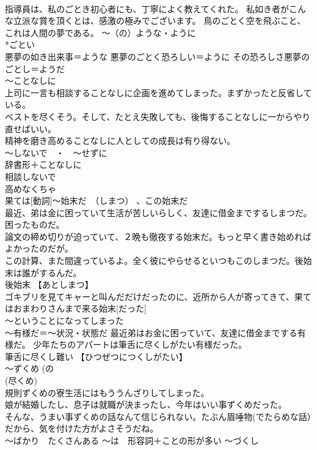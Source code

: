 \documentclass[8pt]{extreport}
\begin{document}
\begin{CJK}{UTF8}{min}
\\	指導員は、私のごとき初心者にも、丁寧によく教えてくれた。 私如き者がこんな立派な賞を頂くとは、感激の極みでございます。 鳥のごとく空を飛ぶこと、これは人間の夢である。	～（の）ような・ように 
\\	*ごとい 
\\	悪夢の如き出来事＝ような 悪夢のごとく恐ろしい＝ように その恐ろしさ悪夢のごとし＝ようだ
\\	～ことなしに	
\\	上司に一言も相談することなしに企画を進めてしまった。まずかったと反省している。 
\\	ベストを尽くそう。そして、たとえ失敗しても、後悔することなしに一からやり直せばいい。 
\\	精神を磨き高めることなしに人としての成長は有り得ない。 
\\	～しないで　・　～せずに 
\\	辞書形＋ことなしに	
\\	相談しないで 
\\	高めなくちゃ
\\	{果ては}[動詞]～始末だ　（しまつ） 、この始末だ	
\\	最近、弟は金に困っていて生活が苦しいらしく、友達に借金までするしまつだ。困ったものだ。
\\	論文の締め切りが迫っていて、２晩も徹夜する始末だ。もっと早く書き始めればよかったのだが。
\\	この計算、また間違っているよ。全く彼にやらせるといつもこのしまつだ。後始末は誰がするんだ。 
\\	後始末 【あとしまつ】 
\\	ゴキブリを見てキャーと叫んだだけだったのに、近所から人が寄ってきて、果てはおまわりさんまで来る始末[だった]　
\\	～ということになってしまった 
\\	～有様だ＝～状況・状態だ 最近弟はお金に困っていて、友達に借金までする有様だ。 少年たちのアパートは筆舌に尽くしがたい有様だった。 
\\	筆舌に尽くし難い 【ひつぜつにつくしがたい】 
\\	～ずくめ (の
\\	(尽くめ)	
\\	規則ずくめの寮生活にはもううんざりしてしまった。 
\\	娘が結婚したし、息子は就職が決まったし、今年はいい事ずくめだった。 
\\	そんな、うまい事ずくめの話なんて信じられない。たぶん眉唾物(でたらめな話）だから、気を付けた方がよさそうだね。 
\\	～ばかり　たくさんある ～は　形容詞＋ことの形が多い	～づくし 

\end{CJK}
\end{document}
